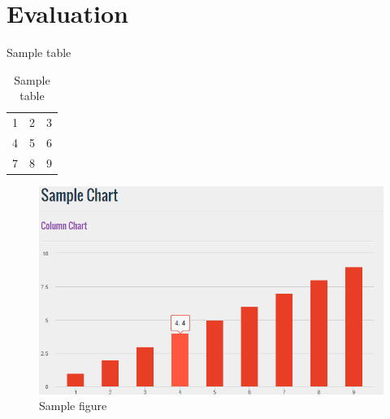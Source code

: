 \chapter{Evaluation}
Sample table \\
\begin{table}[!ht]
    \centering
    \begin{tabular}{ l c r }
      1 & 2 & 3 \\
      4 & 5 & 6 \\
      7 & 8 & 9 \\
    \end{tabular}
    \caption{Sample table}
    \label{tab:table1}
\end{table}

\begin{figure}[ht]
    \centering
    \includegraphics[width=1.0\textwidth]{sample.png}
    \caption{Sample figure}
\end{figure}
